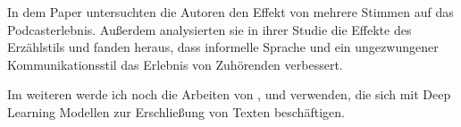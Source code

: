 In dem Paper \cite{kang2012} untersuchten die Autoren den Effekt von mehrere Stimmen auf das Podcasterlebnis. Außerdem analysierten sie in ihrer Studie die Effekte des Erzählstils und fanden heraus, dass informelle Sprache und ein ungezwungener Kommunikationsstil das Erlebnis von Zuhörenden verbessert. 



Im weiteren werde ich noch die Arbeiten von \cite{maroni2020}, \cite{clark2020} und \cite{du2017} verwenden, die sich mit Deep Learning Modellen zur Erschließung von Texten beschäftigen.

